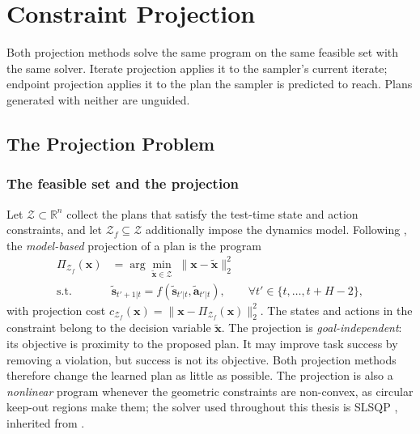 \documentclass[headsepline,footsepline,footinclude=false,oneside,fontsize=11pt,paper=a4,listof=totoc,bibliography=totoc]{scrbook}
\theoremstyle{definition}
\theoremstyle{plain}
\theoremstyle{remark}
\newcommand{\vect}[1]{\boldsymbol{#1}}
\newcommand{\R}{\mathbb{R}}                    %
\newcommand{\proj}[1]{\Pi_{#1}}                %
\begin{document}
\section{Constraint Projection}\label{sec:method:projection}

Both projection methods solve the same program on the same feasible set with the same solver. Iterate
projection applies it to the sampler's current iterate; endpoint projection applies it to the plan the
sampler is predicted to reach. Plans generated with neither are unguided.

\subsection{The Projection Problem}\label{sec:method:proj}

\subsubsection*{The feasible set and the projection}

Let $\mathcal{Z} \subset \R^{n}$ collect the plans that satisfy the test-time state and action
constraints, and let $\mathcal{Z}_{f} \subseteq \mathcal{Z}$ additionally impose the dynamics
model. Following \parencite[Eq.~(9)]{romer2025diffusion}, the \emph{model-based} projection of a plan is the
program
\begin{align}
  \proj{\mathcal{Z}_{f}}(\vect{x})
    &= \arg\min_{\tilde{\vect{x}}\in\mathcal{Z}} \;\|\vect{x}-\tilde{\vect{x}}\|_{2}^{2}
    \label{eq:bg:mpc:proj} \\
  \text{s.t.}\quad & \tilde{\vect{s}}_{t'+1|t}
    = f\!\left(\tilde{\vect{s}}_{t'|t},\tilde{\vect{a}}_{t'|t}\right),
    \qquad \forall t' \in \{t,\dots,t+H-2\},
    \label{eq:bg:mpc:dyn}
\end{align}
with projection cost $c_{\mathcal{Z}_{f}}(\vect{x}) = \|\vect{x}-\proj{\mathcal{Z}_{f}}(\vect{x})\|_{2}^{2}$.
The states and actions in the constraint belong to the decision variable $\tilde{\vect{x}}$.
The projection is \emph{goal-independent}: its objective is proximity to the proposed plan.
It may improve task success by removing a violation, but success is not its objective. Both projection methods therefore
change the learned plan as little as possible. The projection is
also a \emph{nonlinear} program whenever the geometric
constraints are non-convex, as circular keep-out regions make them; the solver used throughout
this thesis is \ac{SLSQP}
\parencite{kraft1988software,virtanen2020scipy}, inherited from \parencite{romer2025diffusion}.
\end{document}
